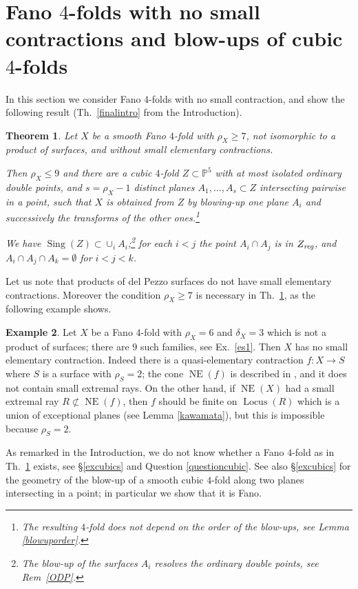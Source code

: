 \documentclass[a4paper,12pt]{amsart}
\newtheorem{thm}{Theorem}[section]
\theoremstyle{definition}
\newtheorem{example}[thm]{Example}
\numberwithin{figure}{section}
\numberwithin{table}{section}
\newcommand{\pr}{\mathbb{P}}
\newcommand{\Sing}{\operatorname{Sing}}
\newcommand{\NE}{\operatorname{NE}}
\newcommand{\Lo}{\operatorname{Locus}}
\newcommand{\reg}{\text{\it reg}}
\begin{document}
    \section{Fano $4$-folds with no small contractions and blow-ups of cubic $4$-folds}\label{cubic}
\noindent In this section we consider Fano $4$-folds with no small contraction, and show the following result (Th.~\ref{finalintro} from the Introduction).
\begin{thm}\label{final}
   Let $X$ be a smooth Fano $4$-fold with $\rho_X\geq 7$, not isomorphic to a product of surfaces, and without small elementary contractions.
             
   Then $\rho_X\leq 9$ and there are a cubic $4$-fold $Z\subset \pr^5$ with at most isolated ordinary double points, and $s=\rho_X-1$ distinct planes  $A_1,\dotsc,A_s\subset Z$ intersecting pairwise in a point, such that $X$ is obtained from $Z$ by blowing-up one plane $A_i$ and successively the transforms of the other ones.\footnote{The resulting $4$-fold does not depend on the order of the blow-ups,  see Lemma \ref{blowuporder}.}

      We have $\Sing(Z)\subset\cup_iA_i$;\footnote{The blow-up of the surfaces $A_i$ resolves the ordinary double points, see Rem~\ref{ODP}.} for each $i< j$ the point $A_i\cap A_j$ is in $Z_{\reg}$, and $A_i\cap A_j\cap A_k=\emptyset$ for $i<j<k$. 
    \end{thm}
    Let us note that products of del Pezzo surfaces do not have small elementary contractions. 
     Moreover the condition $\rho_X\geq 7$ is necessary in Th.~\ref{final}, as the following example shows.
     \begin{example}
Let $X$ be a Fano $4$-fold with $\rho_X=6$ and $\delta_X=3$ which is not a product of surfaces; there are 9 such families, see Ex.~\ref{es1}. Then $X$ has no small elementary contraction. Indeed there is a quasi-elementary contraction $f\colon X\to S$ where $S$ is a surface with $\rho_S=2$; the cone $\NE(f)$ is described in \cite[\S 6]{delta3}, and it does not contain small extremal rays. On the other hand, if $\NE(X)$ had a small extremal ray $R\not\subset\NE(f)$, then $f$ should be finite on $\Lo(R)$ which is a union of exceptional planes (see Lemma \ref{kawamata}), but this is impossible because $\rho_S=2$.
\end{example}
As remarked in the Introduction, we do not know whether a Fano $4$-fold as in Th.~\ref{final} exists, see \S\ref{excubics} and Question \ref{questioncubic}. See also \S\ref{excubics} for the geometry of the blow-up of a smooth cubic $4$-fold along two planes intersecting in a point; in particular we show that it is Fano.
\end{document}
